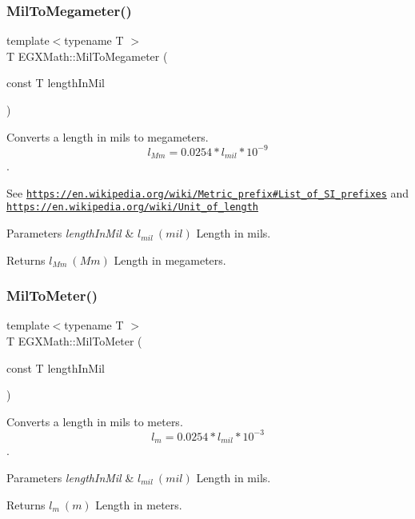 \subsubsection{\texorpdfstring{Mil\+To\+Megameter()}{MilToMegameter()}}
{\footnotesize\ttfamily template$<$typename T $>$ \\
T E\+G\+X\+Math\+::\+Mil\+To\+Megameter (\begin{DoxyParamCaption}\item[{const T}]{length\+In\+Mil }\end{DoxyParamCaption})}



Converts a length in mils to megameters. \[ l_{Mm}=0.0254* l_{mil} * 10^{-9} \]. 

See \href{https://en.wikipedia.org/wiki/Metric_prefix#List_of_SI_prefixes}{\tt https\+://en.\+wikipedia.\+org/wiki/\+Metric\+\_\+prefix\#\+List\+\_\+of\+\_\+\+S\+I\+\_\+prefixes} and \href{https://en.wikipedia.org/wiki/Unit_of_length}{\tt https\+://en.\+wikipedia.\+org/wiki/\+Unit\+\_\+of\+\_\+length} 
\begin{DoxyParams}{Parameters}
{\em length\+In\+Mil} & $ l_{mil}\ (mil)$ Length in mils. \\
\hline
\end{DoxyParams}
\begin{DoxyReturn}{Returns}
$ l_{Mm}\ (Mm)$ Length in megameters. 
\end{DoxyReturn}
\mbox{\label{group___e_g_x_math-_conversions-_length_conversions-_imperial-_mil-_s_i_ga1ee4f51e99ac754f1849f933a661b07c}} 
\subsubsection{\texorpdfstring{Mil\+To\+Meter()}{MilToMeter()}}
{\footnotesize\ttfamily template$<$typename T $>$ \\
T E\+G\+X\+Math\+::\+Mil\+To\+Meter (\begin{DoxyParamCaption}\item[{const T}]{length\+In\+Mil }\end{DoxyParamCaption})}



Converts a length in mils to meters. \[ l_{m}=0.0254 * l_{mil} * 10^{-3} \]. 


\begin{DoxyParams}{Parameters}
{\em length\+In\+Mil} & $ l_{mil}\ (mil)$ Length in mils. \\
\hline
\end{DoxyParams}
\begin{DoxyReturn}{Returns}
$ l_{m}\ (m)$ Length in meters. 
\end{DoxyReturn}
\mbox{\label{group___e_g_x_math-_conversions-_length_conversions-_imperial-_mil-_s_i_ga696a1e5a2043b738df68bf2b9e9be4fc}} 
